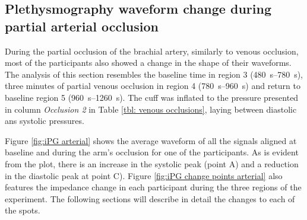 \subsection{Plethysmography waveform change during partial arterial occlusion}
\label{section apa 2.2}
During the partial occlusion of the brachial artery, similarly to venous occlusion, most of the participants also showed a change in the shape of their waveforms. The analysis of this section resembles the baseline time in region 3 (\SIrange{480}{780}{\second}), three minutes of partial venous occlusion in region 4 (\SIrange{780}{960}{\second}) and return to baseline region 5 (\SIrange{960}{1260}{\second}). The cuff was inflated to the pressure presented in column \textit{Occlusion 2} in Table \ref{tbl: venous occlusions}, laying between diastolic ans systolic pressures.

Figure \ref{fig:iPG arterial} shows the average waveform of all the signals aligned at baseline and during the arm's occlusion for one of the participants. As is evident from the plot, there is an increase in the systolic peak (point A) and a reduction in the diastolic peak at point C). Figure \ref{fig:iPG change points arterial} also features the impedance change in each participant during the three regions of the experiment. The following sections will describe in detail the changes to each of the spots.

